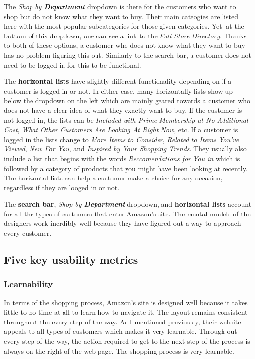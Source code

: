 \documentclass[11pt, oneside]{article}
\begin{document}
The \textit{Shop by \textbf{Department}} dropdown is there for the customers who want to shop but do not know what they want to buy. Their main cateogies are listed here with the most popular subcategories for those given categories. Yet, at the bottom of this dropdown, one can see a link to the \textit{Full Store Directory}. Thanks to both of these options, a customer who does not know what they want to buy has no problem figuring this out. Similarly to the search bar, a customer does not need to be logged in for this to be functional.

The \textbf{horizontal lists} have slightly different functionality depending on if a customer is logged in or not. In either case, many horizontally lists show up below the dropdown on the left which are mainly geared towards a customer who does not have a clear idea of what they exactly want to buy. If the customer is not logged in, the lists can be \textit{Included with Prime Membership at No Additional Cost}, \textit{What Other Customers Are Looking At Right Now}, etc. If a customer is logged in the lists change to \textit{More Items to Consider}, \textit{Related to Items You've Viewed}, \textit{New For You}, and \textit{Inspired by Your Shopping Trends}. They usually also include a list that begins with the words \textit{Reccomendations for You in} which is followed by a category of products that you might have been looking at recently. The horizontal lists can help a customer make a choice for any occasion, regardless if they are looged in or not.

The \textbf{search bar}, \textit{Shop by \textbf{Department}} dropdown, and \textbf{horizontal lists} account for all the types of customers that enter Amazon's site. The mental models of the designers work incrdibly well because they have figured out a way to approach every customer.

\subsection{Five key usability metrics}

\subsubsection{Learnability}
In terms of the shopping process, Amazon's site is designed well because it takes little to no time at all to learn how to navigate it. The layout remains consistent throughout the every step of the way. As I mentioned previously, their website appeals to all types of customers which makes it very learnable. Through out every step of the way, the action required to get to the next step of the process is always on the right of the web page. The shopping process is very learnable.
\end{document}
